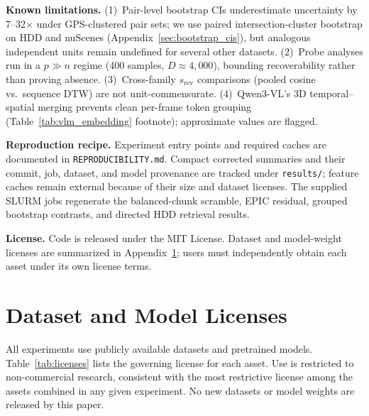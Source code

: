 \documentclass{article}
\theoremstyle{remark}
\begin{document}
\textbf{Known limitations.} (1)~Pair-level bootstrap CIs underestimate uncertainty by 7--32$\times$ under GPS-clustered pair sets; we use paired intersection-cluster bootstrap on HDD and nuScenes (Appendix~\ref{sec:bootstrap_cis}), but analogous independent units remain undefined for several other datasets. (2)~Probe analyses run in a $p\gg n$ regime (400 samples, $D\approx4{,}000$), bounding recoverability rather than proving absence. (3)~Cross-family $s_\text{rev}$ comparisons (pooled cosine vs.\ sequence DTW) are not unit-commensurate. (4)~Qwen3-VL's 3D temporal--spatial merging prevents clean per-frame token grouping (Table~\ref{tab:vlm_embedding} footnote); approximate values are flagged.

\textbf{Reproduction recipe.} Experiment entry points and required caches are documented in \texttt{REPRODUCIBILITY.md}. Compact corrected summaries and their commit, job, dataset, and model provenance are tracked under \texttt{results/}; feature caches remain external because of their size and dataset licenses. The supplied SLURM jobs regenerate the balanced-chunk scramble, EPIC residual, grouped bootstrap contrasts, and directed HDD retrieval results.

\textbf{License.} Code is released under the MIT License. Dataset and model-weight licenses are summarized in Appendix~\ref{sec:licenses}; users must independently obtain each asset under its own license terms.

\section{Dataset and Model Licenses}
\label{sec:licenses}

All experiments use publicly available datasets and pretrained models. Table~\ref{tab:licenses} lists the governing license for each asset. Use is restricted to non-commercial research, consistent with the most restrictive license among the assets combined in any given experiment. No new datasets or model weights are released by this paper.
\end{document}
